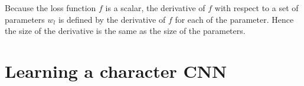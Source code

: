 \documentclass{article}
\begin{document}
Because the loss function $f$ is a scalar, the derivative of $f$ with
respect to a set of parameters $w_l$ is defined by the derivative of
$f$ for each of the parameter. Hence the size of the derivative
is the same as the size of the parameters.


\section{Learning a character CNN}



\end{document}
